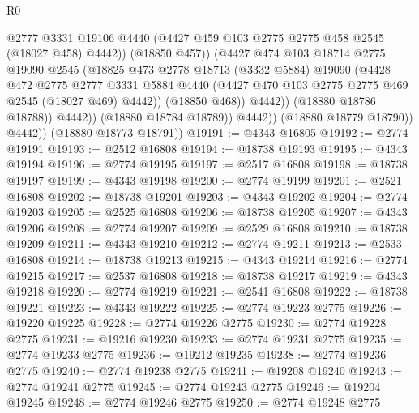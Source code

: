\begin{lexlean}{R0}
\begin{coremodule}
                              @2777
                              @3331
                              @19106
                              @4440
                              (@4427 @459 @103 @2775 @2775 @458 @2545 (@18027 @458) @4442))
                            (@18850 @457))
                          (@4427
                            @474
                            @103
                            @18714
                            @2775
                            @19090
                            @2545
                            (@18825
                              @473
                              @2778
                              @18713
                              (@3332 @5884)
                              @19090
                              (@4428
                                @472
                                @2775
                                @2777
                                @3331
                                @5884
                                @4440
                                (@4427 @470 @103 @2775 @2775 @469 @2545 (@18027 @469) @4442))
                              (@18850 @468))
                            @4442))
                        (@18880 @18786 @18788))
                      @4442))
                  (@18880 @18784 @18789))
                @4442))
            (@18880 @18779 @18790))
          @4442))
      (@18880 @18773 @18791))
@19191 := @4343 @16805
@19192 := @2774 @19191
@19193 := @2512 @16808
@19194 := @18738 @19193
@19195 := @4343 @19194
@19196 := @2774 @19195
@19197 := @2517 @16808
@19198 := @18738 @19197
@19199 := @4343 @19198
@19200 := @2774 @19199
@19201 := @2521 @16808
@19202 := @18738 @19201
@19203 := @4343 @19202
@19204 := @2774 @19203
@19205 := @2525 @16808
@19206 := @18738 @19205
@19207 := @4343 @19206
@19208 := @2774 @19207
@19209 := @2529 @16808
@19210 := @18738 @19209
@19211 := @4343 @19210
@19212 := @2774 @19211
@19213 := @2533 @16808
@19214 := @18738 @19213
@19215 := @4343 @19214
@19216 := @2774 @19215
@19217 := @2537 @16808
@19218 := @18738 @19217
@19219 := @4343 @19218
@19220 := @2774 @19219
@19221 := @2541 @16808
@19222 := @18738 @19221
@19223 := @4343 @19222
@19225 := @2774 @19223 @2775
@19226 := @19220 @19225
@19228 := @2774 @19226 @2775
@19230 := @2774 @19228 @2775
@19231 := @19216 @19230
@19233 := @2774 @19231 @2775
@19235 := @2774 @19233 @2775
@19236 := @19212 @19235
@19238 := @2774 @19236 @2775
@19240 := @2774 @19238 @2775
@19241 := @19208 @19240
@19243 := @2774 @19241 @2775
@19245 := @2774 @19243 @2775
@19246 := @19204 @19245
@19248 := @2774 @19246 @2775
@19250 := @2774 @19248 @2775

\end{coremodule}
\end{lexlean}
